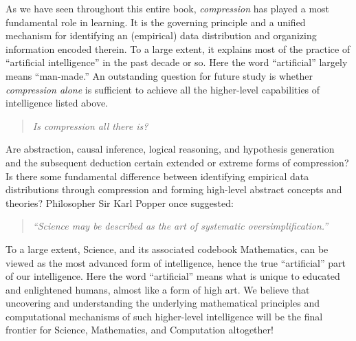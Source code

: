 \documentclass[../../book-main.tex]{subfiles}
\begin{document}
As we have seen throughout this entire book, {\em compression} has played a most fundamental role in learning. It is the governing principle and a unified mechanism for identifying an (empirical) data distribution and organizing information encoded therein. To a large extent, it explains most of the practice of ``artificial intelligence'' in the past decade or so. Here the word ``artificial'' largely means ``man-made.'' An outstanding question for future study is whether {\em compression alone} is sufficient to achieve all the higher-level capabilities of intelligence listed above. 
\begin{quote}
\begin{center}
        {\em Is compression all there is?}
\end{center}
\end{quote}
Are abstraction, causal inference, logical reasoning, and hypothesis generation and the subsequent deduction certain extended or extreme forms of compression? Is there some fundamental difference between identifying empirical data distributions through compression and forming high-level abstract concepts and theories? Philosopher Sir Karl Popper once suggested:
\begin{quote}
    \begin{center}
    {\em ``Science may be described as the art of systematic oversimplification.''}
    \end{center}
\end{quote}
To a large extent, Science, and its associated codebook Mathematics, can be viewed as the most advanced form of intelligence, hence the true ``artificial'' part of our intelligence. Here the word ``artificial'' means what is unique to educated and enlightened humans, almost like a form of high art. We believe that uncovering and understanding the underlying mathematical principles and computational mechanisms of such higher-level intelligence will be the final frontier for Science, Mathematics, and Computation altogether!
\end{document}
